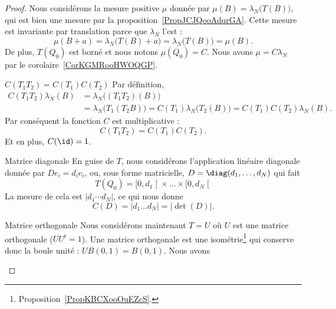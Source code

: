 \begin{proof}
    Nous considérons la mesure positive \( \mu\) donnée par \( \mu(B)=\lambda_N\big( T(B) \big)\), qui est bien une mesure par la proposition~\ref{PropJCJQooAdqrGA}. Cette mesure est invariante par translation parce que \( \lambda_N\) l'est :
    \begin{equation}
        \mu(B+a)=\lambda_N\big( T(B)+a \big)=\lambda_N\big( T(B) \big)=\mu(B).
    \end{equation}
    De plus, \( T(Q_0)\) est borné et nous notons \( \mu(Q_0)=C\). Nous avons \( \mu=C\lambda_N\) par le corolaire~\ref{CorKGMRooHWOQGP}.

    \begin{subproof}
        \item[\( C(T_1T_2)=C(T_1)C(T_2)\)]
            Par définition,
            \begin{subequations}
                \begin{align}
                    C(T_1T_2)\lambda_N(B)&=\lambda_N\big( (T_1T_2)(B) \big)\\
                    &=\lambda_N\big( T_1(T_2B) \big)=C(T_1)\lambda_N\big( T_2(B) \big)=C(T_1)C(T_2)\lambda_N(B).
                \end{align}
            \end{subequations}
            Par conséquent la fonction \( C\) est multiplicative :
            \begin{equation}
                C(T_1T_2)=C(T_1)C(T_2).
            \end{equation}
            Et en plus, \( C(\id)=1\).
        \item[Matrice diagonale]
            En guise de \( T\), nous considérons l'application linéaire diagonale donnée par \( De_i=d_ie_i\), ou, sous forme matricielle, \( D=\diag(d_1,\ldots, d_N)\) qui fait
            \begin{equation}
                T(Q_0)=\mathopen[ 0 , d_1 \mathclose[\times \ldots\times \mathopen[  0, d_N \mathclose[
            \end{equation}
            La mesure de cela est \( |d_1\cdots d_N|\), ce qui nous donne
            \begin{equation}
                C(D)=| d_1\ldots d_N |=| \det(D) |.
            \end{equation}
        \item[Matrice orthogonale]
            Nous considérons maintenant \( T=U\) où \( U\) est une matrice orthogonale (\( UU^t=1\)). Une matrice orthogonale est une isométrie\footnote{Proposition~\ref{PropKBCXooOuEZcS}.} qui conserve donc la boule unité : \( UB(0,1)=B(0,1)\). Nous avons

\end{subproof}
\end{proof}
